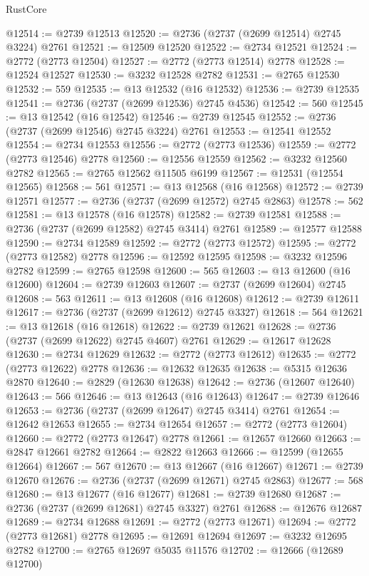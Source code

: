 \begin{lexlean}{RustCore}
\begin{coremodule}
@12514 := @2739 @12513
@12520 := @2736 (@2737 (@2699 @12514) @2745 @3224) @2761
@12521 := @12509 @12520
@12522 := @2734 @12521
@12524 := @2772 (@2773 @12504)
@12527 := @2772 (@2773 @12514) @2778
@12528 := @12524 @12527
@12530 := @3232 @12528 @2782
@12531 := @2765 @12530
@12532 := 559
@12535 := @13 @12532 (@16 @12532)
@12536 := @2739 @12535
@12541 := @2736 (@2737 (@2699 @12536) @2745 @4536)
@12542 := 560
@12545 := @13 @12542 (@16 @12542)
@12546 := @2739 @12545
@12552 := @2736 (@2737 (@2699 @12546) @2745 @3224) @2761
@12553 := @12541 @12552
@12554 := @2734 @12553
@12556 := @2772 (@2773 @12536)
@12559 := @2772 (@2773 @12546) @2778
@12560 := @12556 @12559
@12562 := @3232 @12560 @2782
@12565 := @2765 @12562 @11505 @6199
@12567 := @12531 (@12554 @12565)
@12568 := 561
@12571 := @13 @12568 (@16 @12568)
@12572 := @2739 @12571
@12577 := @2736 (@2737 (@2699 @12572) @2745 @2863)
@12578 := 562
@12581 := @13 @12578 (@16 @12578)
@12582 := @2739 @12581
@12588 := @2736 (@2737 (@2699 @12582) @2745 @3414) @2761
@12589 := @12577 @12588
@12590 := @2734 @12589
@12592 := @2772 (@2773 @12572)
@12595 := @2772 (@2773 @12582) @2778
@12596 := @12592 @12595
@12598 := @3232 @12596 @2782
@12599 := @2765 @12598
@12600 := 565
@12603 := @13 @12600 (@16 @12600)
@12604 := @2739 @12603
@12607 := @2737 (@2699 @12604) @2745
@12608 := 563
@12611 := @13 @12608 (@16 @12608)
@12612 := @2739 @12611
@12617 := @2736 (@2737 (@2699 @12612) @2745 @3327)
@12618 := 564
@12621 := @13 @12618 (@16 @12618)
@12622 := @2739 @12621
@12628 := @2736 (@2737 (@2699 @12622) @2745 @4607) @2761
@12629 := @12617 @12628
@12630 := @2734 @12629
@12632 := @2772 (@2773 @12612)
@12635 := @2772 (@2773 @12622) @2778
@12636 := @12632 @12635
@12638 := @5315 @12636 @2870
@12640 := @2829 (@12630 @12638)
@12642 := @2736 (@12607 @12640)
@12643 := 566
@12646 := @13 @12643 (@16 @12643)
@12647 := @2739 @12646
@12653 := @2736 (@2737 (@2699 @12647) @2745 @3414) @2761
@12654 := @12642 @12653
@12655 := @2734 @12654
@12657 := @2772 (@2773 @12604)
@12660 := @2772 (@2773 @12647) @2778
@12661 := @12657 @12660
@12663 := @2847 @12661 @2782
@12664 := @2822 @12663
@12666 := @12599 (@12655 @12664)
@12667 := 567
@12670 := @13 @12667 (@16 @12667)
@12671 := @2739 @12670
@12676 := @2736 (@2737 (@2699 @12671) @2745 @2863)
@12677 := 568
@12680 := @13 @12677 (@16 @12677)
@12681 := @2739 @12680
@12687 := @2736 (@2737 (@2699 @12681) @2745 @3327) @2761
@12688 := @12676 @12687
@12689 := @2734 @12688
@12691 := @2772 (@2773 @12671)
@12694 := @2772 (@2773 @12681) @2778
@12695 := @12691 @12694
@12697 := @3232 @12695 @2782
@12700 := @2765 @12697 @5035 @11576
@12702 := @12666 (@12689 @12700)

\end{coremodule}
\end{lexlean}
